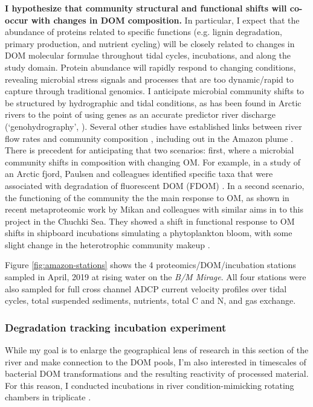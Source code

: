 \documentclass[12pt, letterpaper, twoside]{article}
\begin{document}
\textbf{I hypothesize that community structural and functional shifts will co-occur with changes in DOM composition.} In particular, I expect that the abundance of proteins related to specific functions (e.g. lignin degradation, primary production, and nutrient cycling) will be closely related to changes in DOM molecular formulae throughout tidal cycles, incubations, and along the study domain. Protein abundance will rapidly respond to changing conditions, revealing microbial stress signals and processes that are too dynamic/rapid to capture through traditional genomics. I anticipate microbial community shifts to be structured by hydrographic and tidal conditions, as has been found in Arctic rivers to the point of using genes as an accurate predictor river discharge (‘genohydrography’, \cite{good_predicting_2018}). Several other studies have established links between river flow rates and community composition \cite{crump_synchrony_2005}, including out in the Amazon plume \cite{doherty_bacterial_2017}. 
There is precedent for anticipating that two scenarios: first, where a microbial community shifts in composition with changing OM. For example, in a study of an Arctic fjord, Paulsen and colleagues identified specific taxa that were associated with degradation of fluorescent DOM (FDOM) \cite{paulsen_biological_2019}. In a second scenario, the functioning of the community the the main response to OM, as shown in recent metaproteomic work by Mikan and colleagues with similar aims in to this project in the Chuchki Sea. They showed a shift in functional response to OM shifts in shipboard incubations simulating a phytoplankton bloom, with some slight change in the heterotrophic community makeup \cite{mikan_metaproteomics_2020}.

Figure \ref{fig:amazon-stations} shows the 4 proteomics/DOM/incubation stations sampled in April, 2019 at rising water on the \textit{B/M Mirage}. All four stations were also sampled for full cross channel ADCP current velocity profiles over tidal cycles, total suspended sediments, nutrients, total C and N, and gas exchange. 

\bigskip


\subsubsection{Degradation tracking incubation experiment}

While my goal is to enlarge the geographical lens of research in this section of the river and make connection to the DOM pools, I'm also interested in timescales of bacterial DOM transformations and the resulting reactivity of processed material. For this reason, I conducted incubations in river condition-mimicking rotating chambers in triplicate \cite{ward_marine_2018}. 
\end{document}
